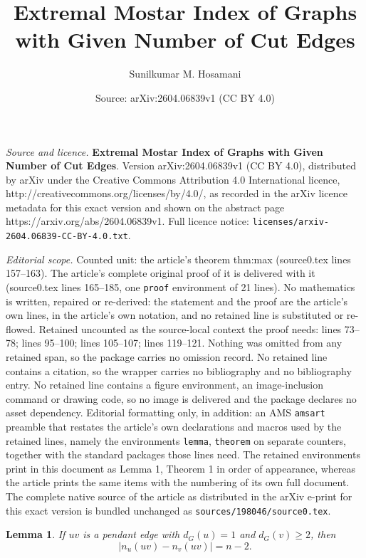 \documentclass[10pt,a4paper]{amsart}
\title{\textbf{Extremal Mostar Index of Graphs with Given Number of Cut Edges}}
\author{Sunilkumar M. Hosamani}
\date{Source: arXiv:2604.06839v1 (CC BY 4.0)}
\newtheorem{lemma}{Lemma}
\begin{document}
\maketitle

\noindent\emph{Source and licence.} \textbf{Extremal Mostar Index of Graphs with Given Number of Cut Edges}. Version arXiv:2604.06839v1 (CC BY 4.0), distributed by arXiv under the Creative Commons Attribution 4.0 International licence, http://creativecommons.org/licenses/by/4.0/, as recorded in the arXiv licence metadata for this exact version and shown on the abstract page https://arxiv.org/abs/2604.06839v1. Full licence notice: \texttt{licenses/arxiv-2604.06839-CC-BY-4.0.txt}.\par\smallskip

\noindent\textit{Editorial scope.} Counted unit: the article's theorem thm:max (source0.tex lines 157--163). The article's complete original proof of it is delivered with it (source0.tex lines 165--185, one \texttt{proof} environment of 21 lines). No mathematics is written, repaired or re-derived: the statement and the proof are the article's own lines, in the article's own notation, and no retained line is substituted or re-flowed.  Retained uncounted as the source-local context the proof needs: lines 73--78; lines 95--100; lines 105--107; lines 119--121.  Nothing was omitted from any retained span, so the package carries no omission record.  No retained line contains a citation, so the wrapper carries no bibliography and no bibliography entry.  No retained line contains a figure environment, an image-inclusion command or drawing code, so no image is delivered and the package declares no asset dependency.  Editorial formatting only, in addition: an AMS \texttt{amsart} preamble that restates the article's own declarations and macros used by the retained lines, namely the environments \texttt{lemma}, \texttt{theorem} on separate counters, together with the standard packages those lines need.  The retained environments print in this document as Lemma 1, Theorem 1 in order of appearance, whereas the article prints the same items with the numbering of its own full document.  The complete native source of the article as distributed in the arXiv e-print for this exact version is bundled unchanged as \texttt{sources/198046/source0.tex}.
\begin{lemma}\label{lem:pendant}
If \(uv\) is a pendant edge with \(d_G(u)=1\) and \(d_G(v)\ge 2\), then
\[
|n_u(uv)-n_v(uv)| = n-2.
\]
\end{lemma}
\end{document}
